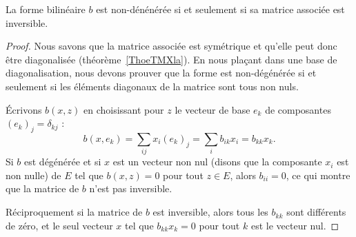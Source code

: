 \begin{proposition}
    La forme bilinéaire \( b\) est non-dénénérée si et seulement si sa matrice associée est inversible.
\end{proposition}

\begin{proof}
    Nous savons que la matrice associée est symétrique et qu'elle peut donc être diagonalisée (théorème~\ref{ThoeTMXla}). En nous plaçant dans une base de diagonalisation, nous devons prouver que la forme est non-dégénérée si et seulement si les éléments diagonaux de la matrice sont tous non nuls.

    Écrivons \( b(x,z)\) en choisissant pour \( z\) le vecteur de base \( e_k\) de composantes \( (e_k)_j=\delta_{kj}\) :
    \begin{equation}
            b(x,e_k)=\sum_{ij}x_i(e_k)_j
            =\sum_i b_{ik}x_i
            =b_{kk}x_k.
    \end{equation}
    Si \( b\) est dégénérée et si \( x\) est un vecteur non nul (disons que la composante \( x_i\) est non nulle) de \( E\) tel que \( b(x,z)=0\) pour tout \( z\in E\), alors \( b_{ii}=0\), ce qui montre que la matrice de \( b\) n'est pas inversible.

    Réciproquement si la matrice de \( b\) est inversible, alors tous les \( b_{kk}\) sont différents de zéro, et le seul vecteur \( x\) tel que \( b_{kk}x_k=0\) pour tout \( k\) est le vecteur nul.
\end{proof}



